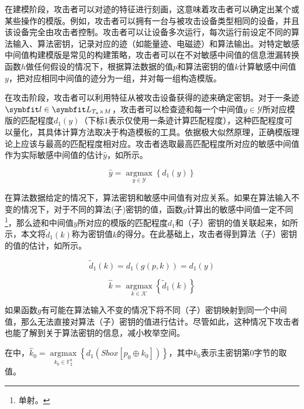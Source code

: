 {	在建模阶段，攻击者可以对迹的特征进行刻画，这意味着攻击者可以确定出某个或某些操作的模版。例如，攻击者可以拥有一台与被攻击设备类型相同的设备，并且该设备完全由攻击者控制。攻击者可以让设备多次运行，每次运行前设定不同的算法输入、算法密钥，记录对应的迹（如能量迹、电磁迹）和算法输出。对特定敏感中间值构建模版是常见的构建策略，攻击者可以在不对敏感中间值的信息泄漏转换函数$h$做任何假设的情况下，根据算法数据的值$p$和算法密钥的值$k$计算敏感中间值$y$，把对应相同中间值的迹分为一组，并对每一组构造模版。
	
	在攻击阶段，攻击者可以利用特征从被攻击设备获得的迹来确定密钥。对于一条迹$\Vector l\in \Vector L_{T_a\times M}$，攻击者可以检查迹和每一个中间值$y\in\mathcal Y$所对应模版的匹配程度$d_1(y)$（下标1表示仅使用一条迹计算匹配程度），这种匹配程度可以量化，其具体计算方法取决于构造模板的工具。依据极大似然原理，正确模版理论上应该与最高的匹配程度相对应\citep{Kay1998}。攻击者选取最高匹配程度所对应的敏感中间值作为实际敏感中间值的估计$\hat y$，如所示。
	
	\begin{equation}\label{eq:1tracey}
		\hat y=\mathop{\mathrm{argmax}}\limits_{y\in\mathcal Y}\left\lbrace d_1(y)\right\rbrace
	\end{equation}
	
	在算法数据给定的情况下，算法密钥和敏感中间值有对应关系。如果在算法输入不变的情况下，对于不同的算法(子)密钥的值，函数$g$计算出的敏感中间值一定不同\footnote{单射。}，那么迹和中间值$y$所对应的模版的匹配程度$d_1$和（子）密钥的值关联起来，如所示，本文将$\tilde d_1(k)$称为密钥值$k$的得分。在此基础上，攻击者得到算法（子）密钥的值的估计，如所示。
	
	\begin{equation}\label{eq:gsup-1}
		\tilde d_1(k)=d_1\left(g(p,k) \right)=d_1(y)
	\end{equation}
	
	\begin{equation}\label{eq:1tracek}
		\hat k=\mathop{\mathrm{argmax}}\limits_{k\in\mathcal K}\left\lbrace \tilde d_1(k)\right\rbrace 
	\end{equation}
	
	如果函数$g$有可能在算法输入不变的情况下将不同（子）密钥映射到同一个中间值，那么无法直接对算法（子）密钥的值进行估计。尽管如此，这种情况下攻击者也能了解到关于算法密钥的信息，减小枚举空间。
	
	\begin{example}
		在中，$\hat k_0=\mathop{\mathrm{argmax}}\limits_{k_0\in\mathbb F_2^8}\left\lbrace d_1\left(Sbox\left[p_0\oplus k_0\right]\right)\right\rbrace $，其中$k_0$表示主密钥第0字节的取值。
	\end{example}

}
